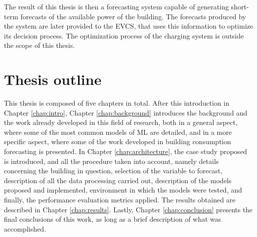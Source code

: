 The result of this thesis is then a forecasting system capable of generating short-term forecasts of the available power of the building. The forecasts produced by the system are later provided to the \ac{EVCS}, that uses this information to optimize its decision process. The optimization process of the charging system is outside the scope of this thesis.

\section{Thesis outline}

This thesis is composed of five chapters in total. After this introduction in Chapter \ref{chap:intro}, Chapter \ref{chap:background} introduces the background and the work already developed in this field of research, both in a general aspect, where some of the most common models of \ac{ML} are detailed, and in a more specific aspect, where some of the work developed in building consumption forecasting is presented. In Chapter \ref{chap:architecture}, the case study proposed is introduced, and all the procedure taken into account, namely details concerning the building in question, selection of the variable to forecast, description of all the data processing carried out, description of the models proposed and implemented, environment in which the models were tested, and finally, the performance evaluation metrics applied. The results obtained are described in Chapter \ref{chap:results}. Lastly, Chapter \ref{chap:conclusion} presents the final conclusions of this work, as long as a brief description of what was accomplished.